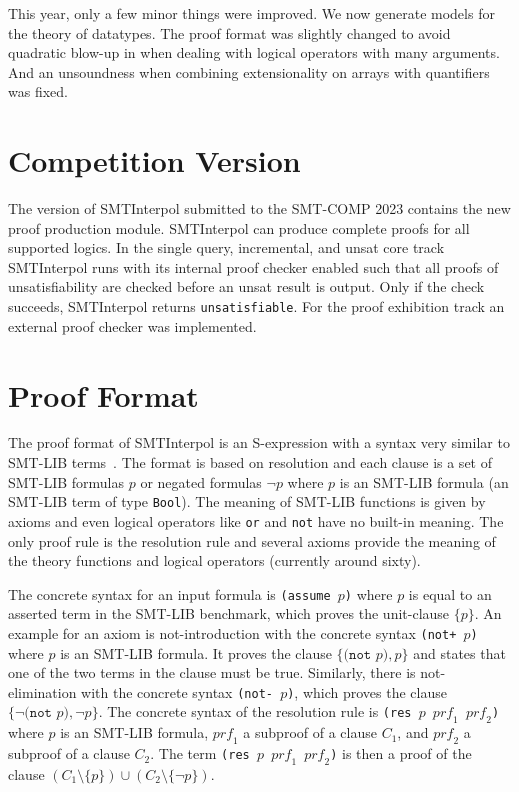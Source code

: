\documentclass[a4paper]{easychair}
\newcommand\SI{SMTInterpol\xspace}
\newcommand\smtlib[1]{\texttt{#1}}
\newcommand\prf{\mathit{prf}}
\begin{document}
 This year, only a few minor things were improved.  We now generate models for the theory of datatypes.  The proof format was slightly changed to avoid quadratic blow-up in when dealing with logical operators with many arguments.  And an unsoundness when combining extensionality on arrays with quantifiers was fixed.

\section*{Competition Version}
The version of \SI submitted to the SMT-COMP 2023 contains the new proof production module.
\SI can produce complete proofs for all supported logics.
In the single query, incremental, and unsat core track \SI runs with its internal proof checker enabled such that all proofs of unsatisfiability are checked before an unsat result is output.
Only if the check succeeds, \SI returns \texttt{unsatisfiable}.
For the proof exhibition track an external proof checker was implemented.

\section*{Proof Format}

The proof format of \SI is an S-expression with a syntax very similar to SMT-LIB terms~\cite{DBLP:conf/smt/HoenickeS22}.
The format is based on resolution and each clause is a set of SMT-LIB formulas $p$ or negated formulas $\lnot p$ where $p$ is an SMT-LIB formula (an SMT-LIB term of type \smtlib{Bool}).
The meaning of SMT-LIB functions is given by axioms and even logical operators like \smtlib{or} and \smtlib{not} have no built-in meaning.
The only proof rule is the resolution rule and several axioms provide the meaning of the theory functions and logical operators (currently around sixty).

The concrete syntax for an input formula is \smtlib{(assume $p$)} where $p$ is equal to an asserted term in the SMT-LIB benchmark, which proves the unit-clause $\{ p \}$.
An example for an axiom is not-introduction with the concrete syntax \smtlib{(not+ $p$)} where $p$ is an SMT-LIB formula.
It proves the clause $\{ \smtlib{(not $p$)}, p \}$ and states that one of the two terms in the clause must be true.
Similarly, there is not-elimination with the concrete syntax \smtlib{(not- $p$)}, which proves the clause $\{ \lnot \smtlib{(not $p$)}, \lnot \smtlib{$p$}\}$.
The concrete syntax of the resolution rule is \smtlib{(res $p$ $\prf_1$ $\prf_2$)} where $p$ is an SMT-LIB formula, $\prf_1$ a subproof of a clause $C_1$, and $\prf_2$ a subproof of a clause $C_2$.
The term \smtlib{(res $p$ $\prf_1$ $\prf_2$)} is then a proof of the clause $(C_1\setminus\{p\}) \cup (C_2\setminus\{\lnot p\})$.
\end{document}
